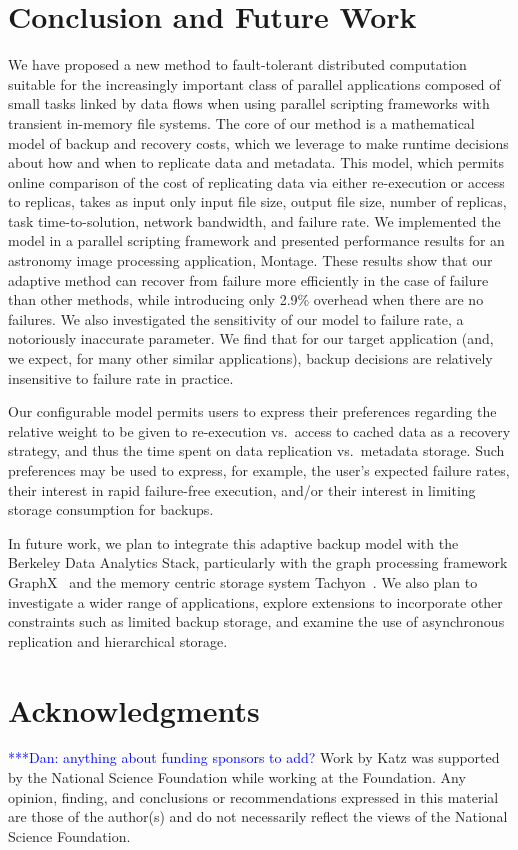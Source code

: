 \documentclass{sig-alternate}
\newcommand{\katznote}[1]{ {\textcolor{blue}    { ***Dan:      #1 }}}
\newcommand{\zhaonote}[1]{{\textcolor{cyan}    { ***Zhao:      #1 }}}
\newcommand{\katznote}[1]{}
\newcommand{\zhaonote}[1]{}
\begin{document}
\section{Conclusion and Future Work}
\label{sec:Con}
We have proposed a new method to fault-tolerant distributed computation suitable for the increasingly important class of parallel applications composed of small tasks linked by data flows when using parallel scripting frameworks with transient in-memory file systems. %
The core of our method is a mathematical model of backup and recovery costs, which we leverage to make runtime decisions about how and when to replicate data and metadata. This model, which permits online comparison of the cost of replicating data via either re-execution or access to replicas, takes as input only input file size, output file size, number of replicas, task time-to-solution, network bandwidth, and failure rate.
We implemented the model in a parallel scripting framework and presented performance results for an astronomy image processing application, Montage.
These results show that our adaptive method can recover from failure more efficiently in the case of failure than other methods, while introducing only 2.9\% overhead when there are no failures. We also investigated the sensitivity of our model to failure rate, a notoriously inaccurate parameter. We find that for our target application (and, we expect, for many other similar applications), backup decisions are relatively insensitive to failure rate in practice.

Our configurable model permits users to express their preferences regarding the relative weight to be given to re-execution vs.\ access to cached data as a recovery strategy,
and thus the time spent on data replication vs.\ metadata storage. Such preferences may be used to express, for example, the user's expected failure rates, their interest
in rapid failure-free execution, and/or their interest in limiting storage consumption for backups.

In future work, we plan to integrate this adaptive backup model with the Berkeley Data Analytics Stack, particularly with
the graph processing framework GraphX~\cite{graphx2014} and the memory centric storage system Tachyon~\cite{tachyon2014}.
We also plan to investigate a wider range of applications, explore extensions to incorporate other constraints such as limited backup storage,
and examine the use of asynchronous replication and hierarchical storage.

\section{Acknowledgments}
\katznote{anything about funding sponsors to add?}
Work by Katz was supported by the National
Science Foundation while working at the Foundation.  Any opinion, finding, and
conclusions or recommendations expressed in this material are those of the
author(s) and do not necessarily reflect the views of the National Science
Foundation.





\end{document}
